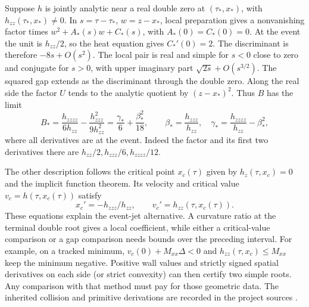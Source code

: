 Suppose \(h\) is jointly analytic near a real double zero at
\((\tau_*,x_*)\), with \(h_{zz}(\tau_*,x_*)\ne0\). In
\(s=\tau-\tau_*\), \(w=z-x_*\), local preparation gives a nonvanishing
factor times \(w^2+A_*(s)w+C_*(s)\), with \(A_*(0)=C_*(0)=0\).
At the event the unit is \(h_{zz}/2\), so the heat equation gives
\(C_*'(0)=2\). The discriminant is therefore \(-8s+O(s^2)\).
The local pair is real and simple for \(s<0\) close to zero and
conjugate for \(s>0\), with upper imaginary part
\(\sqrt{2s}+O(s^{3/2})\). The squared gap extends as the discriminant
through the double zero. Along the real side the factor \(U\) tends to
the analytic quotient by \((z-x_*)^2\). Thus \(B\) has the limit
\begin{equation}
\label{eq:event-curvature}
B_*=\frac{h_{zzzz}}{6h_{zz}}-\frac{h_{zzz}^2}{9h_{zz}^2}
    =\frac{\gamma_*}{6}+\frac{\beta_*^2}{18},\qquad
\beta_*=\frac{h_{zzz}}{h_{zz}},\quad
\gamma_*=\frac{h_{zzzz}}{h_{zz}}-\beta_*^2 ,
\end{equation}
where all derivatives are at the event. Indeed the factor and its
first two derivatives there are \(h_{zz}/2,h_{zzz}/6,h_{zzzz}/12\).

The other description follows the critical point \(x_c(\tau)\) given by
\(h_z(\tau,x_c)=0\) and the implicit function theorem. Its velocity and
critical value \(v_c=h(\tau,x_c(\tau))\) satisfy
\[
x_c'=-h_{zzz}/h_{zz},\qquad v_c'=h_{zz}(\tau,x_c(\tau)).
\]
These equations explain the event-jet alternative. A curvature ratio
at the terminal double root gives a local coefficient, while either
a critical-value comparison or a gap comparison needs bounds over the
preceding interval. For example, on a tracked minimum,
\(v_c(0)+M_{xx}\Delta<0\) and \(h_{zz}(\tau,x_c)\le M_{xx}\) keep
the minimum negative. Positive wall values and strictly signed spatial derivatives
on each side (or strict convexity) can then certify two simple roots.
Any comparison with that method must pay for those geometric data.
The inherited collision and primitive derivations are recorded in the
project sources \cite{OARecord}.
